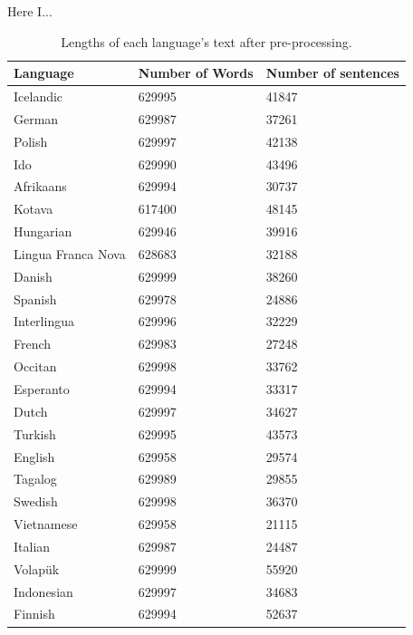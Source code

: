 \documentclass[12pt,a4paper]{article}
\numberwithin{figure}{section}
\numberwithin{table}{section}
\numberwithin{definition}{section}
\begin{document}
Here I...

\begin{table}[h!]
  \centering
  \renewcommand{\arraystretch}{1.5}
  \begin{tabular} {|p{3cm}|p{3cm}|p{3.5cm}|}
  \hline
  \textbf{Language} & \textbf{Number of Words} & \textbf{Number of sentences} \\
  \hline
  Icelandic & 629995 & 41847 \\
  German & 629987 & 37261 \\
  Polish & 629997 & 42138 \\
  Ido & 629990 & 43496 \\
  Afrikaans & 629994 & 30737 \\
  Kotava & 617400 & 48145 \\
  Hungarian & 629946 & 39916 \\
  Lingua Franca Nova & 628683 & 32188 \\
  Danish & 629999 & 38260 \\
  Spanish & 629978 & 24886 \\
  Interlingua & 629996 & 32229 \\
  French & 629983 & 27248 \\
  Occitan & 629998 & 33762 \\
  Esperanto & 629994 & 33317 \\
  Dutch & 629997 & 34627 \\
  Turkish & 629995 & 43573 \\
  English & 629958 & 29574 \\
  Tagalog & 629989 & 29855 \\
  Swedish & 629998 & 36370 \\
  Vietnamese & 629958 & 21115 \\
  Italian & 629987 & 24487 \\
  Volapük & 629999 & 55920 \\
  Indonesian & 629997 & 34683 \\
  Finnish & 629994 & 52637 \\
  \hline
  \end{tabular}
\caption{Lengths of each language's text after pre-processing.}
\label{tbl:preprocessedtexts}
\end{table}


\end{document}
